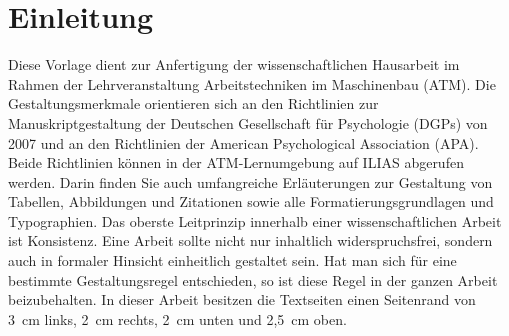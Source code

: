 \chapter{Einleitung}

Diese Vorlage dient zur Anfertigung der wissenschaftlichen Hausarbeit im Rahmen der Lehrveranstaltung Arbeitstechniken im Maschinenbau (ATM). Die Gestaltungsmerkmale orientieren sich an den Richtlinien zur Manuskriptgestaltung der Deutschen Gesellschaft für Psychologie (DGPs) von 2007 und an den Richtlinien der American Psychological Association (APA). Beide Richtlinien können in der ATM-Lernumgebung auf ILIAS abgerufen werden. Darin finden Sie auch umfangreiche Erläuterungen zur Gestaltung von Tabellen, Abbildungen und Zitationen sowie alle Formatierungsgrundlagen und Typographien. Das oberste Leitprinzip innerhalb einer wissenschaftlichen Arbeit ist Konsistenz. Eine Arbeit sollte nicht nur inhaltlich widerspruchsfrei, sondern auch in formaler Hinsicht einheitlich gestaltet sein. Hat man sich für eine bestimmte Gestaltungsregel entschieden, so ist diese Regel in der ganzen Arbeit beizubehalten. In dieser Arbeit besitzen die Textseiten einen Seitenrand von 3~cm links, 2~cm rechts, 2~cm unten und 2,5~cm oben. 

